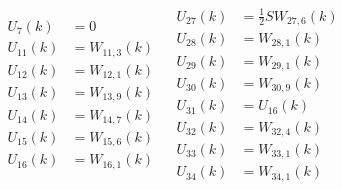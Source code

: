 \begin{align} \label{eq:allRecRel3}
\begin{split}
U_{7} \left(k\right)&=0 \\
U_{11}\left(k\right)&=W_{11,3}\left(k\right)\\
U_{12}\left(k\right)&=W_{12,1}\left(k\right)\\
U_{13}\left(k\right)&=W_{13,9}\left(k\right)\\
U_{14}\left(k\right)&=W_{14,7}\left(k\right)\\
U_{15}\left(k\right)&=W_{15,6}\left(k\right)\\
U_{16}\left(k\right)&=W_{16,1}\left(k\right)\\
\end{split}
&
\begin{split}
U_{27}\left(k\right)&=\frac{1}{2}SW_{27,6}\left(k\right)\\
U_{28}\left(k\right)&=W_{28,1}\left(k\right)\\
U_{29}\left(k\right)&=W_{29,1}\left(k\right)\\
U_{30}\left(k\right)&=W_{30,9}\left(k\right)\\
U_{31}\left(k\right)&=U_{16}\left(k\right)\\
U_{32}\left(k\right)&=W_{32,4}\left(k\right)\\
U_{33}\left(k\right)&=W_{33,1}\left(k\right)\\
U_{34}\left(k\right)&=W_{34,1}\left(k\right)\\
\end{split}
\end{align}





